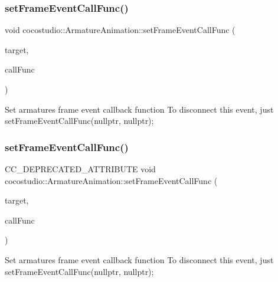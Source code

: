 \subsubsection{\texorpdfstring{set\+Frame\+Event\+Call\+Func()}{setFrameEventCallFunc()}\hspace{0.1cm}{\footnotesize\ttfamily [1/2]}}
{\footnotesize\ttfamily void cocostudio\+::\+Armature\+Animation\+::set\+Frame\+Event\+Call\+Func (\begin{DoxyParamCaption}\item[{cocos2d\+::\+Ref $\ast$}]{target,  }\item[{S\+E\+L\+\_\+\+Frame\+Event\+Call\+Func}]{call\+Func }\end{DoxyParamCaption})}

Set armature\textquotesingle{}s frame event callback function To disconnect this event, just set\+Frame\+Event\+Call\+Func(nullptr, nullptr); \mbox{\label{classcocostudio_1_1ArmatureAnimation_a646b072a0805d3067cdffaa0df2bec47}} 
\subsubsection{\texorpdfstring{set\+Frame\+Event\+Call\+Func()}{setFrameEventCallFunc()}\hspace{0.1cm}{\footnotesize\ttfamily [2/2]}}
{\footnotesize\ttfamily C\+C\+\_\+\+D\+E\+P\+R\+E\+C\+A\+T\+E\+D\+\_\+\+A\+T\+T\+R\+I\+B\+U\+TE void cocostudio\+::\+Armature\+Animation\+::set\+Frame\+Event\+Call\+Func (\begin{DoxyParamCaption}\item[{cocos2d\+::\+Ref $\ast$}]{target,  }\item[{S\+E\+L\+\_\+\+Frame\+Event\+Call\+Func}]{call\+Func }\end{DoxyParamCaption})}

Set armature\textquotesingle{}s frame event callback function To disconnect this event, just set\+Frame\+Event\+Call\+Func(nullptr, nullptr); \mbox{\label{classcocostudio_1_1ArmatureAnimation_a0289c29d3df8b35258cabc4d2f1ad7da}} 
